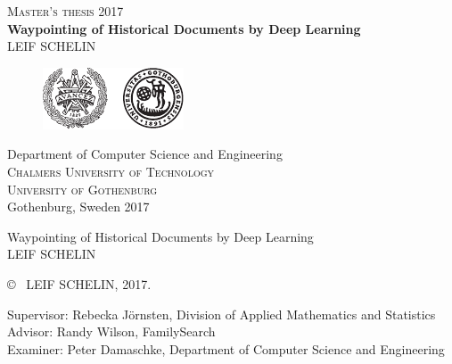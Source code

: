 \newpage
\thispagestyle{empty}
\begin{center}
	\textsc{\large Master's thesis 2017}\\[4cm]		%
	\textbf{\Large Waypointing of Historical Documents by Deep Learning
	} \\[1cm]
	{\large LEIF SCHELIN}
	
	\vfill	
	\begin{figure}[H]
	\centering
	\includegraphics[width=0.4\pdfpagewidth]{figures/auxiliary/logo_ch_gu.pdf}
	\end{figure}	\vspace{5mm}	
	
	Department of Computer Science and Engineering\\
	\textsc{Chalmers University of Technology} \\
	\textsc{University of Gothenburg} \\
	Gothenburg, Sweden 2017 \\
\end{center}


\newpage
\thispagestyle{plain}
\vspace*{4.5cm}
Waypointing of Historical Documents by Deep Learning\\
LEIF SCHELIN \setlength{\parskip}{1cm}

\copyright ~ LEIF SCHELIN, 2017. \setlength{\parskip}{1cm}

Supervisor: Rebecka Jörnsten, Division of Applied Mathematics and Statistics\\
Advisor: Randy Wilson, FamilySearch\\
Examiner: Peter Damaschke, Department of Computer Science and Engineering \setlength{\parskip}{1cm}

